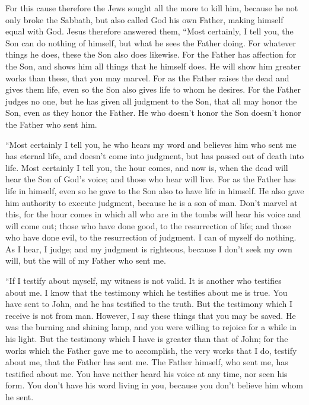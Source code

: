  For this cause therefore the Jews sought all the more to
kill him, because he not only broke the Sabbath, but also called God his
own Father, making himself equal with God.  Jesus therefore
answered them, ``Most certainly, I tell you, the Son can do nothing of
himself, but what he sees the Father doing. For whatever things he does,
these the Son also does likewise.  For the Father has
affection for the Son, and shows him all things that he himself does. He
will show him greater works than these, that you may marvel.
 For as the Father raises the dead and gives them life,
even so the Son also gives life to whom he desires.  For
the Father judges no one, but he has given all judgment to the Son,
 that all may honor the Son, even as they honor the Father.
He who doesn't honor the Son doesn't honor the Father who sent him.

 ``Most certainly I tell you, he who hears my word and
believes him who sent me has eternal life, and doesn't come into
judgment, but has passed out of death into life.  Most
certainly I tell you, the hour comes, and now is, when the dead will
hear the Son of God's voice; and those who hear will live. 
For as the Father has life in himself, even so he gave to the Son also
to have life in himself.  He also gave him authority to
execute judgment, because he is a son of man.  Don't marvel
at this, for the hour comes in which all who are in the tombs will hear
his voice  and will come out; those who have done good, to
the resurrection of life; and those who have done evil, to the
resurrection of judgment.  I can of myself do nothing. As I
hear, I judge; and my judgment is righteous, because I don't seek my own
will, but the will of my Father who sent me.

 ``If I testify about myself, my witness is not valid.
 It is another who testifies about me. I know that the
testimony which he testifies about me is true.  You have
sent to John, and he has testified to the truth.  But the
testimony which I receive is not from man. However, I say these things
that you may be saved.  He was the burning and shining
lamp, and you were willing to rejoice for a while in his light.
 But the testimony which I have is greater than that of
John; for the works which the Father gave me to accomplish, the very
works that I do, testify about me, that the Father has sent me.
 The Father himself, who sent me, has testified about me.
You have neither heard his voice at any time, nor seen his form.
 You don't have his word living in you, because you don't
believe him whom he sent.

